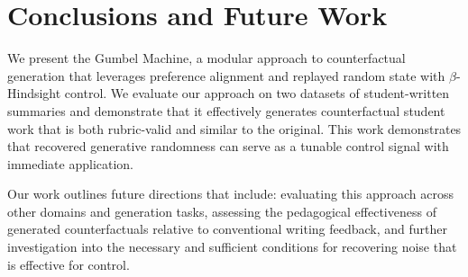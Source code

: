 \documentclass[11pt]{article}
\newcommand{\mh}[1]{\textcolor{teal}{\bf [Hunter: #1]}}
\newcommand{\al}[1]{\textcolor{blue}{\bf [Alex: #1]}}
\begin{document}




\section{Conclusions and Future Work}
We present the Gumbel Machine, a modular approach to counterfactual generation that leverages preference alignment and replayed random state with $\beta$-Hindsight control.
We evaluate our approach on two datasets of student-written summaries and demonstrate that it effectively generates counterfactual student work that is both rubric-valid and similar to the original. This work demonstrates that recovered generative randomness can serve as a tunable control signal with immediate application.

Our work outlines future directions that include: evaluating this approach across other domains and generation tasks, assessing the pedagogical effectiveness of generated counterfactuals relative to conventional writing feedback, and further investigation into the necessary and sufficient conditions for recovering noise that is effective for control.
\end{document}

